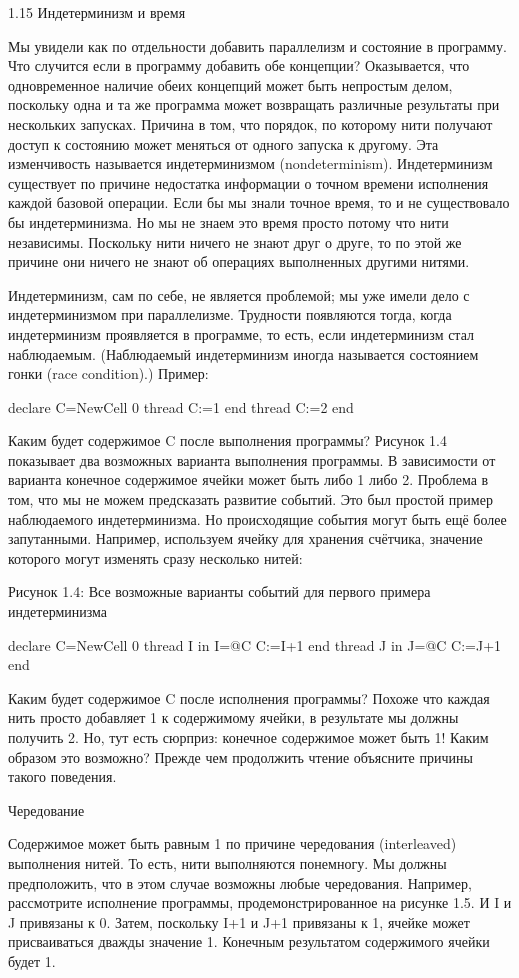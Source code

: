 1.15 Индетерминизм и время

Мы увидели как по отдельности добавить параллелизм и состояние в программу. Что случится если в программу добавить обе концепции? Оказывается, что одновременное наличие обеих концепций может быть непростым делом, поскольку одна и та же программа может возвращать различные результаты при нескольких запусках. Причина в том, что порядок, по которому нити получают доступ к состоянию может меняться от одного запуска к другому. Эта изменчивость называется индетерминизмом (nondeterminism). Индетерминизм существует по причине недостатка информации о точном времени исполнения каждой базовой операции. Если бы мы знали точное время, то и не существовало бы индетерминизма. Но мы не знаем это время просто потому что нити независимы. Поскольку нити ничего не знают друг о друге, то по этой же причине они ничего не знают об операциях выполненных другими нитями.

Индетерминизм, сам по себе, не является проблемой; мы уже имели дело с индетерминизмом при параллелизме. Трудности появляются тогда, когда индетерминизм проявляется в программе, то есть, если индетерминизм стал наблюдаемым. (Наблюдаемый индетерминизм иногда называется состоянием гонки (race condition).) Пример:

declare
C={NewCell 0}
thread
C:=1
end
thread
C:=2
end

Каким будет содержимое C после выполнения программы? Рисунок 1.4 показывает два возможных варианта выполнения программы. В зависимости от варианта конечное содержимое ячейки может быть либо 1 либо 2. Проблема в том, что мы не можем предсказать развитие событий. Это был простой пример наблюдаемого индетерминизма. Но происходящие события могут быть ещё более запутанными. Например, используем ячейку для хранения счётчика, значение которого могут изменять сразу несколько нитей:

Рисунок 1.4: Все возможные варианты событий для первого примера индетерминизма

declare
C={NewCell 0}
thread I in
I=@C
C:=I+1
end
thread J in
J=@C
C:=J+1
end

Каким будет содержимое C после исполнения программы? Похоже что каждая нить просто добавляет 1 к содержимому ячейки, в результате мы должны получить 2. Но, тут есть сюрприз: конечное содержимое может быть 1! Каким образом это возможно? Прежде чем продолжить чтение объясните причины такого поведения.

Чередование

Содержимое может быть равным 1 по причине чередования (interleaved) выполнения нитей. То есть, нити выполняются понемногу. Мы должны предположить, что в этом случае возможны любые чередования. Например, рассмотрите исполнение программы, продемонстрированное на рисунке 1.5. И I и J привязаны к 0. Затем, поскольку I+1 и J+1 привязаны к 1, ячейке может присваиваться дважды значение 1. Конечным результатом содержимого ячейки будет 1.

